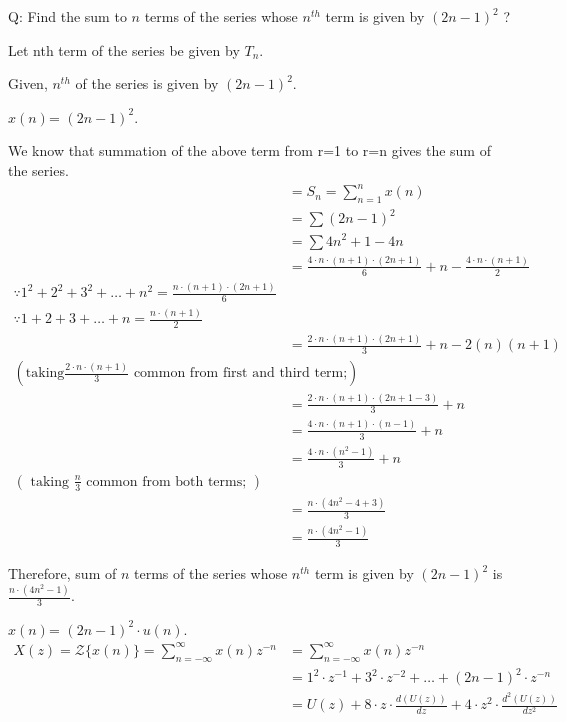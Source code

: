 \documentclass[journal,12pt,onecolumn]{IEEEtran}
\theoremstyle{remark}
\begin{document}
\let\vec\mathbf




\vspace{3cm}



\bigskip

\renewcommand{\thefigure}{\theenumi}
\renewcommand{\thetable}{\theenumi}

Q: Find the sum to $n$ terms of the series whose $n^{th}$ term is given by $(2n-1)^2$ ?

\solution

Let nth term of the series be given by $T_n$.

Given, $n^{th}$ of the series is given by $(2n-1)^2$.

$x(n)$= $(2n-1)^2$.

We know that summation of the above term from r=1 to r=n gives the sum of the series.
\begin{align}
&=S_n = \sum_{n=1}^{n} x(n) \\
&=\sum(2n-1)^2 \\
&=\sum 4n^2+1-4n \\
&=\frac{4 \cdot n \cdot (n+1) \cdot (2n+1)}{6} + n -\frac{4 \cdot n \cdot (n+1)}{2} \\
\because 1^2 + 2^2 + 3^2 + \ldots + n^2 = \frac{n \cdot (n + 1) \cdot (2n + 1)}{6}\\
\because 1 + 2 + 3 + \ldots + n = \frac{n \cdot (n + 1)}{2}\\
&=\frac{2 \cdot n \cdot (n+1) \cdot (2n+1)}{3} + n - 2(n)(n+1) \\
(\text{taking} 
\frac{ 2 \cdot n \cdot (n+1)}{3}
\text{ common from first and third term;})\\
&=\frac{2 \cdot n \cdot (n+1) \cdot (2n+1-3)}{3} + n \\
&=\frac{4 \cdot n \cdot (n+1) \cdot (n-1)}{3} + n \\
&=\frac{ 4 \cdot n \cdot (n^2-1)}{3} + n  \\
(\text{ taking }
\frac{n}{3}
\text{ common from both terms; }) \\
&=\frac{n \cdot (4n^2-4+3)}{3} \\
&=\frac{n \cdot (4n^2-1)}{3}
\end{align}

Therefore, sum of $n$ terms of the series whose $n^{th}$ term is given by $(2n-1)^2$ is $\frac{n \cdot (4n^2-1)}{3}$.

$x(n)$= $(2n-1)^2 \cdot u(n)$.
\begin{align}
X(z) = \mathcal{Z}\{x(n)\} = \sum_{n=-\infty}^{\infty} x(n)z^{-n} 
&=\sum_{n=-\infty}^{\infty} x(n)z^{-n} \\
&= 1^2 \cdot z^{-1} + 3^2\cdot z^{-2} +\ldots + (2n-1)^2 \cdot z^{-n} \\
&= U(z) + 8 \cdot z \cdot \frac{d(U(z))}{dz} + 4 \cdot z^{2} \cdot  \frac{d^2(U(z))}{dz^{2}}
\end{align}
\end{document}
